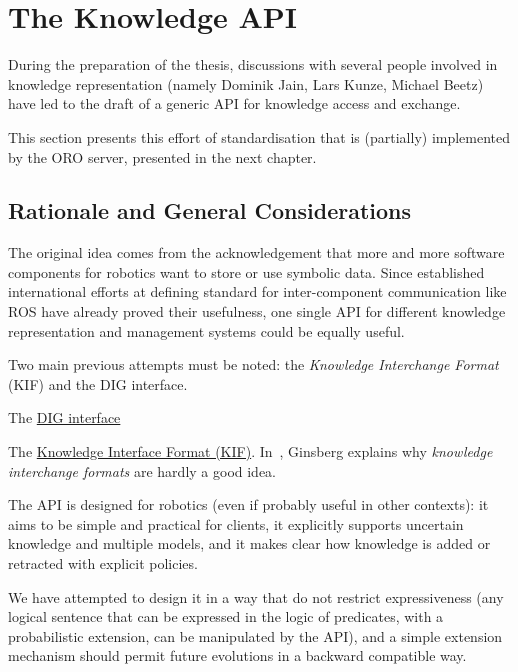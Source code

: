 
\section{The Knowledge API}
\label{sect|knowledge-api}

During the preparation of the thesis, discussions with several people involved
in knowledge representation (namely Dominik Jain, Lars Kunze, Michael Beetz)
have led to the draft of a generic API for knowledge access and exchange.

This section presents this effort of standardisation that is (partially)
implemented by the ORO server, presented in the next chapter.

\subsection{Rationale and General Considerations}

The original idea comes from the acknowledgement that more and more software
components for robotics want to store or use symbolic data. Since established
international efforts at defining standard for inter-component communication
like ROS have already proved their usefulness, one single API for different
knowledge representation and management systems could be equally useful.

Two main previous attempts must be noted: the \emph{Knowledge Interchange
Format} (KIF) and the DIG interface.

The \href{http://dig.sourceforge.net/}{ DIG interface}

The \href{http://logic.stanford.edu/kif/dpans.html}{ Knowledge Interface Format
(KIF)}. In~\cite{Ginsberg1991}, Ginsberg explains why \emph{knowledge
interchange formats} are hardly a good idea.

The API is designed for robotics (even if probably useful in other contexts):
it aims to be simple and practical for clients, it explicitly supports
uncertain knowledge and multiple models, and it makes clear how knowledge is
added or retracted with explicit policies.

We have attempted to design it in a way that do not restrict expressiveness
(any logical sentence that can be expressed in the logic of predicates, with a
probabilistic extension, can be manipulated by the API), and a simple extension
mechanism should permit future evolutions in a backward compatible way.

